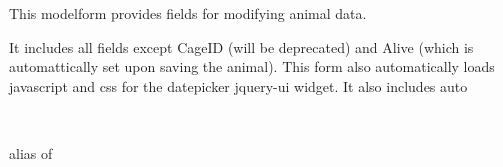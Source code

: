 \documentclass[letterpaper,10pt,english]{sphinxmanual}
\begin{document}
\begin{fulllineitems}
\label{api:animal.forms.AnimalForm}
This modelform provides fields for modifying animal data.

It includes all fields except CageID (will be deprecated) and Alive (which is automattically set upon saving the animal).
This form also automatically loads javascript and css for the datepicker jquery-ui widget.  It also includes auto

\begin{fulllineitems}
\label{api:animal.forms.AnimalForm.Media}
\end{fulllineitems}


\begin{fulllineitems}
\label{api:animal.forms.AnimalForm.Meta}~

\begin{fulllineitems}
\label{api:animal.forms.AnimalForm.Meta.model}
alias of 

\end{fulllineitems}


\end{fulllineitems}


\begin{fulllineitems}
\label{api:animal.forms.AnimalForm.media}
\end{fulllineitems}


\end{fulllineitems}

\end{document}
